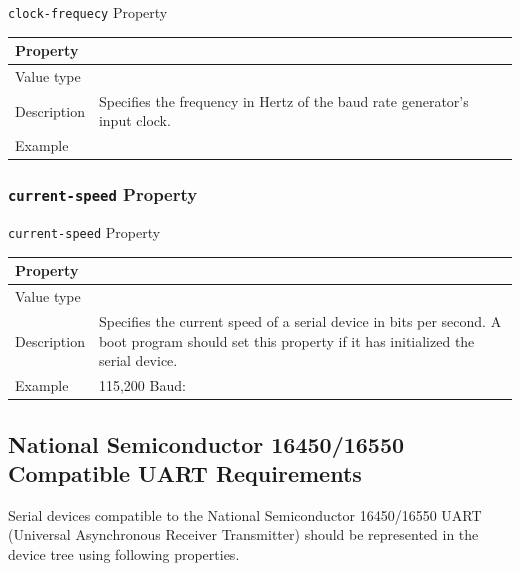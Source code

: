 \documentclass[a4paper,10pt,oneside]{sphinxmanual}
\begin{document}
\begin{threeparttable}
\capstart\caption{\texttt{clock-frequecy} Property}\label{device-bindings:id5}
\begin{tabulary}{\linewidth}{l J}
\hline
\textsf{\relax 
Property
} & \textsf{\relax 
{}
}\\
\hline
Value type
 & 
\\
\hline
Description
 & 
Specifies the frequency in Hertz of the baud rate generator's
input clock.
\\
\hline
Example
 & 
\\
\hline\end{tabulary}

\end{threeparttable}



\subsubsection{\texttt{current-speed} Property}
\label{device-bindings:current-speed-property}

\begin{threeparttable}
\capstart\caption{\texttt{current-speed} Property}\label{device-bindings:id6}
\begin{tabulary}{\linewidth}{l J}
\hline
\textsf{\relax 
Property
} & \textsf{\relax 
{}
}\\
\hline
Value type
 & 
\\
\hline
Description
 & 
Specifies the current speed of a serial device in bits per
second. A boot program should set this property if it has
initialized the serial device.
\\
\hline
Example
 & 
115,200 Baud: 
\\
\hline\end{tabulary}

\end{threeparttable}



\subsection{National Semiconductor 16450/16550 Compatible UART Requirements}
\label{device-bindings:national-semiconductor-16450-16550-compatible-uart-requirements}
Serial devices compatible to the National Semiconductor 16450/16550 UART
(Universal Asynchronous Receiver Transmitter) should be represented in
the device tree using following properties.
\end{document}
